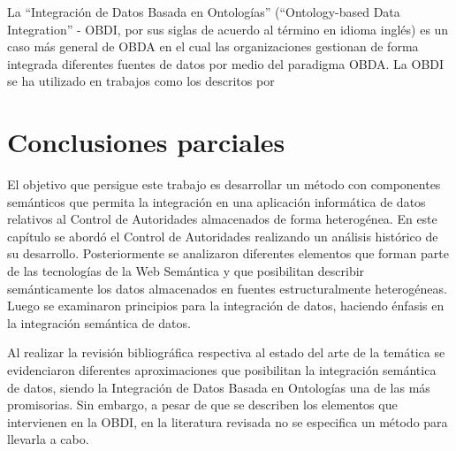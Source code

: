 La ``Integración de Datos Basada en Ontologías'' (``Ontology-based Data Integration'' - OBDI, por sus siglas de acuerdo al término en idioma inglés) es un caso más general de OBDA en el cual las organizaciones gestionan de forma integrada diferentes fuentes de datos por medio del paradigma OBDA. La OBDI se ha utilizado en trabajos como los descritos por \cite{Calvanese2016,Daraio2016,Kharlamov:2016:OIS:2882903.2899385}

\section{Conclusiones parciales}
El objetivo que persigue este trabajo es desarrollar un método con componentes semánticos que permita la integración en una aplicación informática de datos relativos al Control de Autoridades almacenados de forma heterogénea. En este capítulo se abordó el Control de Autoridades realizando un análisis histórico de su desarrollo. Posteriormente se analizaron diferentes elementos que forman parte de las tecnologías de la Web Semántica y que posibilitan describir semánticamente los datos almacenados en fuentes estructuralmente heterogéneas. Luego se examinaron principios para la integración de datos, haciendo énfasis en la integración semántica de datos.

Al realizar la revisión bibliográfica respectiva al estado del arte de la temática se evidenciaron diferentes aproximaciones que posibilitan la integración semántica de datos, siendo la Integración de Datos Basada en Ontologías una de las más promisorias. Sin embargo, a pesar de que se describen los elementos que intervienen en la OBDI, en la literatura revisada no se especifica un método para llevarla a cabo.








